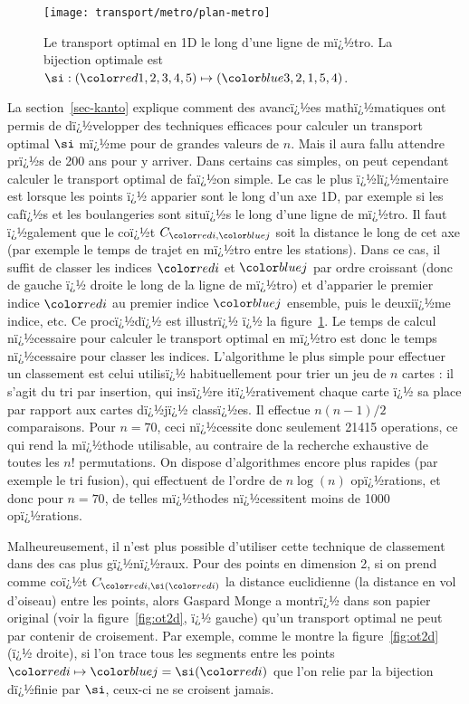 \begin{figure}\centering
    \texttt{[image: transport/metro/plan-metro]}
    \caption{\label{fig:metro} Le transport optimal en 1D le long d'une ligne de mï¿½tro. La bijection optimale est  
    $\si : (\Red{1,2,3,4,5}) \mapsto (\Blu{3,2,1,5,4})$. } 
\end{figure}


La section~\ref{sec-kanto} explique comment des avancï¿½es mathï¿½matiques ont permis de dï¿½velopper des techniques efficaces pour calculer un transport optimal $\si$ mï¿½me pour de grandes valeurs de $n$. Mais il aura fallu attendre prï¿½s de 200 ans pour y arriver. Dans certains cas simples, on peut cependant calculer le transport optimal de faï¿½on simple. Le cas le plus ï¿½lï¿½mentaire est lorsque les points ï¿½ apparier sont le long d'un axe 1D, par exemple si les cafï¿½s et les boulangeries sont situï¿½s le long d'une ligne de mï¿½tro. Il faut ï¿½galement que le coï¿½t $C_{\iC,\jC}$ soit la distance le long de cet axe (par exemple le temps de trajet en mï¿½tro entre les stations). Dans ce cas, il suffit de classer les indices $\iC$ et $\jC$ par ordre croissant (donc de gauche ï¿½ droite le long de la ligne de mï¿½tro) et d'apparier le premier indice $\iC$ au premier indice $\jC$ ensemble, puis le deuxiï¿½me indice, etc. Ce procï¿½dï¿½ est illustrï¿½ ï¿½ la figure~\ref{fig:metro}.  Le temps de calcul nï¿½cessaire pour calculer le transport optimal en mï¿½tro est donc le temps nï¿½cessaire pour classer les indices. L'algorithme le plus simple pour effectuer un classement est celui utilisï¿½ habituellement pour trier un jeu de $n$ cartes : il s'agit du tri par insertion, qui insï¿½re itï¿½rativement chaque carte ï¿½ sa place par rapport aux cartes dï¿½jï¿½ classï¿½es. Il effectue $n(n-1)/2$ comparaisons. Pour $n=70$, ceci nï¿½cessite donc seulement 21415 operations, ce qui rend la mï¿½thode utilisable, au contraire de la recherche exhaustive de toutes les $n!$ permutations.
% 
On dispose d'algorithmes encore plus rapides (par exemple le tri fusion), qui effectuent de l'ordre de $n \log(n)$ opï¿½rations, et donc pour $n = 70$, de telles mï¿½thodes nï¿½cessitent moins de 1000 opï¿½rations. 

Malheureusement, il n'est plus possible d'utiliser cette technique de classement dans des cas plus gï¿½nï¿½raux. Pour des points en dimension 2, si on prend comme coï¿½t $C_{\iC,\si(\iC)}$ la distance euclidienne (la distance en vol d'oiseau) entre les points, alors Gaspard Monge a montrï¿½ dans son papier original (voir la figure~\ref{fig:ot2d}, ï¿½ gauche) qu'un transport optimal ne peut par contenir de croisement. Par exemple, comme le montre la figure~\ref{fig:ot2d} (ï¿½ droite), si l'on trace tous les segments entre les points $\iC \mapsto \jC = \si(\iC)$  que l'on relie par la bijection dï¿½finie par $\si$, ceux-ci ne se croisent jamais. 

